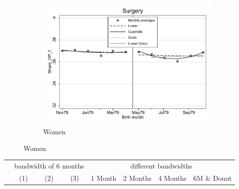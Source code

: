 \documentclass[a4paper ]{article}
\begin{document}
\begin{figure}[h]
\begin{subfigure}[t]{0.31\textwidth}
		\centering
		\includegraphics[width=0.99\textwidth]{R1_RD_Share_OP_f_fits}
		\caption{Women}
	\end{subfigure}
\end{figure}


\begin{table}[h]\centering
\def\sym#1{\ifmmode^{#1}\else\(^{#1}\)\fi}
\begin{tabular}{l*{3}{c}|cccc}
\toprule
&\multicolumn{3}{c}{bandwidth of 6 months} & \multicolumn{4}{c}{different bandwidths} \\
 \cmidrule(lr{1em}){2-4} \cmidrule(lr{1em}){5-8}
 &\multicolumn{1}{c}{(1)}&\multicolumn{1}{c}{(2)}&\multicolumn{1}{c}{(3)}& 1 Month & 2 Months & 4 Months & 6M \& Donut \\
\midrule 

\bottomrule
\end{tabular}
\end{table}
\end{document}
